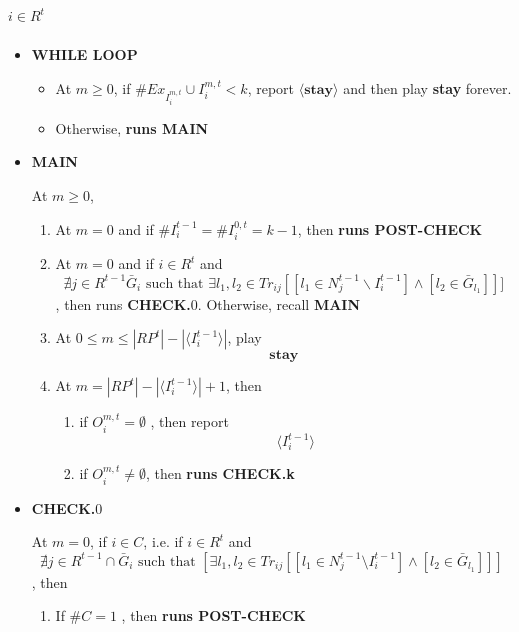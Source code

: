 \documentclass[12pt,letter]{article}
\theoremstyle{definition}
\theoremstyle{remark}
\theoremstyle{claim}
\begin{document}
\subparagraph{$i\in R^{t}$}

\begin{itemize}

\item \textbf{WHILE LOOP}
\begin{itemize}
\item At $m\geq 0$, if $\# Ex_{I^{m,t}_i}\cup I^{m,t}_i< k$, report $\langle \textbf{stay} \rangle$ and then play \textbf{stay} forever.
\item Otherwise, \textbf{runs MAIN }
\end{itemize}


\item \textbf{MAIN}

At $m\geq 0$, 

\begin{enumerate}
\item At $m=0$ and if $\# I^{t-1}_i=\# I^{0,t}_i= k-1$, then 
\textbf{runs POST-CHECK }


\item At $m=0$ and if $i\in R^t$ and
\[\nexists j\in R^{t-1}\bar{G}_i \text{ such that }\exists l_1,l_2\in Tr_{ij}[[l_1\in N^{t-1}_j\backslash I^{t-1}_i] \wedge [l_2\in \bar{G}_{l_1}]]]\]
, then runs \textbf{CHECK.$0$}. Otherwise, recall \textbf{MAIN}
\item At $0\leq m \leq |RP^t|-|\langle I^{t-1}_i \rangle|$, play
\[\textbf{stay}\]
\item At $m = |RP^t|-|\langle I^{t-1}_i \rangle|+1$, then
\begin{enumerate}
\item if $O^{m,t}_i= \emptyset$ 
, then report
\[\langle I^{t-1}_i \rangle\]
\item if $O^{m,t}_i\neq \emptyset$, then \textbf{runs CHECK.k}

\end{enumerate}

\end{enumerate}





\item \textbf{CHECK.$0$}

At $m=0$, if $i\in C$, i.e. if $i\in R^t$ and
\[\nexists j\in R^{t-1}\cap \bar{G}_i \text{ such that }[\exists l_1,l_2\in Tr_{ij}[[l_1\in N^{t-1}_j\setminus I^{t-1}_i] \wedge [l_2\in \bar{G}_{l_1}]]]\]
, then
\begin{enumerate}
\item If $\#C=1$
, then 
\textbf{runs POST-CHECK }


\end{enumerate}
\end{itemize}
\end{document}
